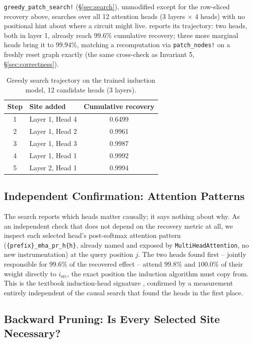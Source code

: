 \documentclass{article}
\begin{document}
\texttt{greedy\_patch\_search!} (\S\ref{sec:search}), unmodified except for the row-sliced
recovery above, searches over all 12 attention heads (3 layers $\times$ 4 heads) with no
positional hint about where a circuit might live.  reports its
trajectory: two heads, both in layer 1, already reach $99.6\%$ cumulative recovery; three more
marginal heads bring it to $99.94\%$, matching a recomputation via \texttt{patch\_nodes!} on a
freshly reset graph exactly (the same cross-check as Invariant 5, \S\ref{sec:correctness}).

\begin{table}[H]
\centering
\caption{Greedy search trajectory on the trained induction model, 12 candidate heads (3 layers).}
\label{tab:induction-greedy}
\begin{tabular}{c l c}
\toprule
\textbf{Step} & \textbf{Site added} & \textbf{Cumulative recovery} \\
\midrule
1 & Layer 1, Head 4 & 0.6499 \\
\rowcolor{rowgray}
2 & Layer 1, Head 2 & 0.9961 \\
3 & Layer 1, Head 3 & 0.9987 \\
\rowcolor{rowgray}
4 & Layer 1, Head 1 & 0.9992 \\
5 & Layer 2, Head 1 & 0.9994 \\
\bottomrule
\end{tabular}
\end{table}

\subsection{Independent Confirmation: Attention Patterns}

The search reports which heads matter causally; it says nothing about why. As an independent
check that does not depend on the recovery metric at all, we inspect each selected head's
post-softmax attention pattern (\texttt{\{prefix\}\_mha\_pr\_h\{h\}}, already named and exposed by
\texttt{MultiHeadAttention}, no new instrumentation) at the query position $j$. The two heads
found first -- jointly responsible for $99.6\%$ of the recovered effect -- attend $99.8\%$ and
$100.0\%$ of their weight directly to $i_{\text{src}}$, the exact position the induction algorithm
must copy from. This is the textbook induction-head signature \cite{induction}, confirmed by a
measurement entirely independent of the causal search that found the heads in the first place.

\subsection{Backward Pruning: Is Every Selected Site Necessary?}
\label{sec:backwardprune}
\end{document}
